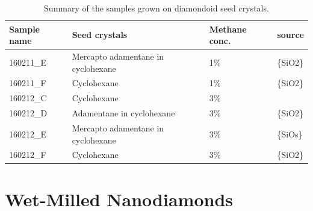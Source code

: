 	\begin{table}[tp] 
		\centering 
		\caption{Summary of the samples grown on diamondoid seed crystals.} \label{tab::diamondiods} 
			\begin{tabular}{llll} 
			\toprule
			Sample name & Seed crystals & Methane conc. & \Si source \\ 
			\midrule
			160211\_E & Mercapto adamentane in cyclohexane & 1\% & \ch\{SiO2\} \\
			160211\_F & Cyclohexane                        & 1\% & \ch\{SiO2\} \\
			160212\_C & Cyclohexane                        & 3\% & \si         \\
			160212\_D & Adamentane in cyclohexane          & 3\% & \ch\{SiO2\} \\
			160212\_E & Mercapto adamentane in cyclohexane & 3\% & \ch\{SiOs\} \\
			160212\_F & Cyclohexane                        & 3\% & \ch\{SiO2\}\\
			\bottomrule
			\end{tabular} 
	\end{table}






	\section[Wet-Milling]{Wet-Milled Nanodiamonds}\label{sec::wet_milled_nds}

